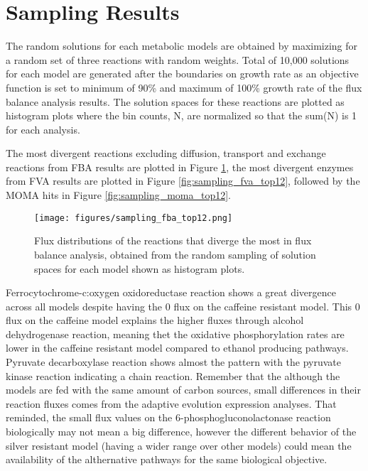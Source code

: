 \section{Sampling Results}

The random solutions for each metabolic models are obtained by maximizing  for a random set of three reactions with random weights. Total of 10,000 solutions for each model are generated after the boundaries on growth rate as an objective function is set to minimum of 90\% and maximum of 100\% growth rate of the flux balance analysis results. The solution spaces for these reactions are plotted as histogram plots where the bin counts, N, are normalized so that the sum(N) is 1 for each analysis.

The most divergent reactions excluding diffusion, transport and exchange reactions from FBA results are plotted in Figure \ref{fig:sampling_fba_top12}, the most divergent enzymes from FVA results are plotted in Figure \ref{fig:sampling_fva_top12}, followed by the MOMA hits in Figure \ref{fig:sampling_moma_top12}.

\begin{figure}[H]
  \begin{center}
  \texttt{[image: figures/sampling\_fba\_top12.png]}
  \caption[Flux distributions of the reactions that diverge the most in flux balance analysis, obtained from the random sampling of solution spaces for each model shown as histogram plots]{Flux distributions of the reactions that diverge the most in flux balance analysis, obtained from the random sampling of solution spaces for each model shown as histogram plots.}
  \label{fig:sampling_fba_top12}
  \end{center}
\end{figure}

Ferrocytochrome-c:oxygen oxidoreductase reaction shows a great divergence across all models despite having the 0 flux on the caffeine resistant model. This 0 flux on the caffeine model explains the higher fluxes through alcohol dehydrogenase reaction, meaning thet the oxidative phosphorylation rates are lower in the caffeine resistant model compared to ethanol producing pathways. Pyruvate decarboxylase reaction shows almost the pattern with the pyruvate kinase reaction indicating a chain reaction. Remember that the although the models are fed with the same amount of carbon sources, small differences in their reaction fluxes comes from the adaptive evolution expression analyses. That reminded, the small flux values on the 6-phosphogluconolactonase reaction biologically may not mean a big difference, however the different behavior of the silver resistant model (having a wider range over other models) could mean the availability of the althernative pathways for the same biological objective.


